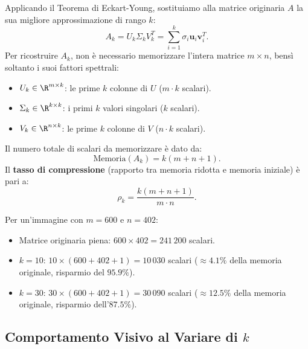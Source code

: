 Applicando il Teorema di Eckart-Young, sostituiamo alla matrice originaria $A$ la sua migliore approssimazione di rango $k$:
\begin{equation}
    A_k = U_k \Sigma_k V_k^T = \sum_{i=1}^k \sigma_i \mathbf{u}_i \mathbf{v}_i^T.
\end{equation}
Per ricostruire $A_k$, non \`e necessario memorizzare l'intera matrice $m \times n$, bens\`i soltanto i suoi fattori spettrali:
\begin{itemize}
    \item $U_k \in \R^{m \times k}$: le prime $k$ colonne di $U$ ($m \cdot k$ scalari).
    \item $\Sigma_k \in \R^{k \times k}$: i primi $k$ valori singolari ($k$ scalari).
    \item $V_k \in \R^{n \times k}$: le prime $k$ colonne di $V$ ($n \cdot k$ scalari).
\end{itemize}
Il numero totale di scalari da memorizzare \`e dato da:
\begin{equation}
    \text{Memoria}(A_k) = k(m + n + 1).
\end{equation}
Il \textbf{tasso di compressione} (rapporto tra memoria ridotta e memoria iniziale) \`e pari a:
\begin{equation}
    \rho_k = \frac{k(m + n + 1)}{m \cdot n}.
\end{equation}

\begin{example}
Per un'immagine con $m = 600$ e $n = 402$:
\begin{itemize}
    \item Matrice originaria piena: $600 \times 402 = 241\,200$ scalari.
    \item $k = 10$: $10 \times (600 + 402 + 1) = 10\,030$ scalari ($\approx 4.1\%$ della memoria originale, risparmio del $95.9\%$).
    \item $k = 30$: $30 \times (600 + 402 + 1) = 30\,090$ scalari ($\approx 12.5\%$ della memoria originale, risparmio dell'$87.5\%$).
\end{itemize}
\end{example}

\subsection{Comportamento Visivo al Variare di $k$}

